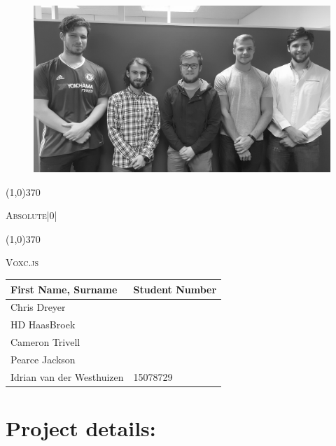 \documentclass[english]{article}
\begin{document}
	
	
	\begin{figure}
		\includegraphics[width=\linewidth]{teamphoto.jpg}
	\end{figure}
	
	\begin{center}
		\line(1,0){370}
		\\[0.2cm]
		{\scshape\Large Absolute|0|  \par}
		\vspace{0.1cm}
		\line(1,0){370}
		\\[0.8cm]
		
		{\scshape\Large Voxc.js \par}
		\vspace{0.9cm}
		
		\begin{tabu} to \textwidth { X[l] X[l]}
			\hline
			\textbf{First Name, Surname  }	& \textbf{Student Number}	\\ \hline \hline
			Chris Dreyer   	&	\\ \hline
			HD HaasBroek  	&	\\ \hline
			Cameron   Trivell		&	\\ \hline
			Pearce    Jackson		&	\\ \hline
			Idrian van der Westhuizen    &15078729	\\ \hline
			\hline
		\end{tabu}
		
	\end{center}
	
	
	\newpage
	\tableofcontents
	
	\newpage

	\section*{Project details:}
	\newline
	
\end{document}

